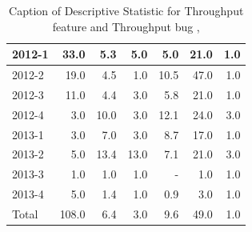 \documentclass[UKenglish]{ifimaster}  %
\begin{document}
\begin{table}[!htbp]
\begin{adjustwidth}{-2.5cm}{}
{{\begin{tabular}{ | l | r | r | r | r | r | r | }
2012-1 & 33.0 & 5.3 & 5.0 & 5.0 & 21.0 & 1.0\\ \hline
2012-2 & 19.0 & 4.5 & 1.0 & 10.5 & 47.0 & 1.0\\ \hline
2012-3 & 11.0 & 4.4 & 3.0 & 5.8 & 21.0 & 1.0\\ \hline
2012-4 & 3.0 & 10.0 & 3.0 & 12.1 & 24.0 & 3.0\\ \hline
2013-1 & 3.0 & 7.0 & 3.0 & 8.7 & 17.0 & 1.0\\ \hline
2013-2 & 5.0 & 13.4 & 13.0 & 7.1 & 21.0 & 3.0\\ \hline
2013-3 & 1.0 & 1.0 & 1.0 & - & 1.0 & 1.0\\ \hline
2013-4 & 5.0 & 1.4 & 1.0 & 0.9 & 3.0 & 1.0\\ \hline
Total & 108.0 & 6.4 & 3.0 & 9.6 & 49.0 & 1.0\\ \hline
\end{tabular}
}
}
\end{adjustwidth}
\caption[Optional caption for list of figures]{Caption of Descriptive Statistic for Throughput feature and Throughput bug  , }
\label{DS:1:2}
\end{table}
\end{document}
